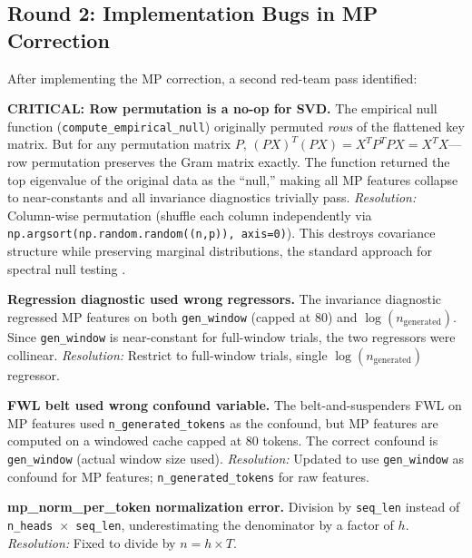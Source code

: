 \subsection{Round 2: Implementation Bugs in MP Correction}

After implementing the MP correction, a second red-team pass identified:

\begin{redteam}
\textbf{CRITICAL: Row permutation is a no-op for SVD.} The empirical null
function (\texttt{compute\_empirical\_null}) originally permuted
\emph{rows} of the flattened key matrix. But for any permutation matrix
$P$, $(PX)^T(PX) = X^T P^T P X = X^TX$---row permutation preserves the
Gram matrix exactly. The function returned the top eigenvalue of the
original data as the ``null,'' making all MP features collapse to
near-constants and all invariance diagnostics trivially pass.
\textit{Resolution:} Column-wise permutation (shuffle each column
independently via \texttt{np.argsort(np.random.random((n,p)), axis=0)}).
This destroys covariance structure while preserving marginal distributions,
the standard approach for spectral null testing \citep{buja2009comment}.
\end{redteam}

\begin{redteam}
\textbf{Regression diagnostic used wrong regressors.} The invariance
diagnostic regressed MP features on both \texttt{gen\_window} (capped at
80) and $\log(n_{\text{generated}})$. Since \texttt{gen\_window} is
near-constant for full-window trials, the two regressors were collinear.
\textit{Resolution:} Restrict to full-window trials, single
$\log(n_{\text{generated}})$ regressor.
\end{redteam}

\begin{redteam}
\textbf{FWL belt used wrong confound variable.} The belt-and-suspenders
FWL on MP features used \texttt{n\_generated\_tokens} as the confound, but
MP features are computed on a windowed cache capped at 80 tokens.
The correct confound is \texttt{gen\_window} (actual window size used).
\textit{Resolution:} Updated to use \texttt{gen\_window} as confound for
MP features; \texttt{n\_generated\_tokens} for raw features.
\end{redteam}

\begin{redteam}
\textbf{mp\_norm\_per\_token normalization error.} Division by
\texttt{seq\_len} instead of \texttt{n\_heads $\times$ seq\_len},
underestimating the denominator by a factor of $h$.
\textit{Resolution:} Fixed to divide by $n = h \times T$.
\end{redteam}

